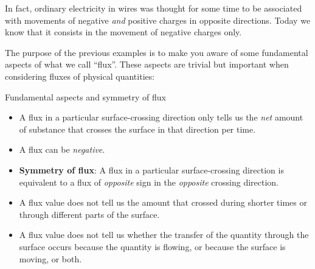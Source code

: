 \documentclass[a4paper,12pt,%
onecolumn,oneside,%
british%
]{memoir}
\renewcommand*{\|}[1][]{\nonscript\:#1\vert\nonscript\:\mathopen{}}
\begin{document}
%
In fact, ordinary electricity in wires was thought for some time to be associated with movements of negative \emph{and} positive charges in opposite directions. Today we know that it consists in the movement of negative charges only.

\medskip

The purpose of the previous examples is to make you aware of some fundamental aspects of what we call \enquote{flux}. These aspects are trivial but important when considering fluxes of physical quantities:
%
\begin{definition}{Fundamental aspects and symmetry of flux}\label{def:symmetryflux}
  \begin{itemize}[nosep]
  \item A flux in a particular surface-crossing direction only tells us the \emph{net} amount of substance that crosses the surface in that direction per time.

  \item A flux can be \emph{negative}.

  \item \textbf{Symmetry of flux}: A flux in a particular surface-crossing direction is equivalent to a flux of \emph{opposite} sign in the \emph{opposite} crossing direction.
  \end{itemize}
\end{definition}%
%
%

\begin{warning}
  \begin{itemize}[nosep]
  \item A flux value does not tell us the amount that crossed during shorter times or through different parts of the surface.

\item A flux value does not tell us whether the transfer of the quantity through the surface occurs because the quantity is flowing, or because the surface is moving, or both.
  \end{itemize}
\end{warning}
\end{document}
